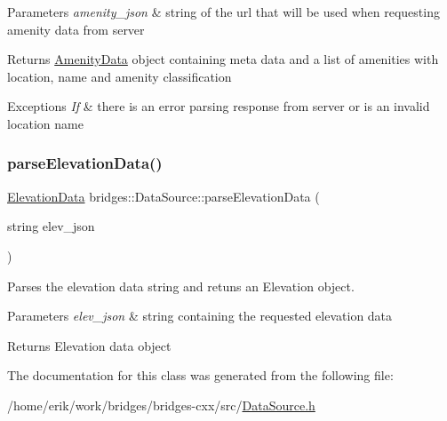 \begin{DoxyParams}{Parameters}
{\em amenity\+\_\+json} & string of the url that will be used when requesting amenity data from server\\
\hline
\end{DoxyParams}
\begin{DoxyReturn}{Returns}
\hyperlink{class_amenity_data}{Amenity\+Data} object containing meta data and a list of amenities with location, name and amenity classification
\end{DoxyReturn}

\begin{DoxyExceptions}{Exceptions}
{\em If} & there is an error parsing response from server or is an invalid location name \\
\hline
\end{DoxyExceptions}
\mbox{\label{classbridges_1_1_data_source_a84f1c70c6dd5be2f3df97015025c0dd3}} 
\subsubsection{\texorpdfstring{parse\+Elevation\+Data()}{parseElevationData()}}
{\footnotesize\ttfamily \hyperlink{classbridges_1_1dataset_1_1_elevation_data}{Elevation\+Data} bridges\+::\+Data\+Source\+::parse\+Elevation\+Data (\begin{DoxyParamCaption}\item[{string}]{elev\+\_\+json }\end{DoxyParamCaption})\hspace{0.3cm}{\ttfamily [inline]}}



Parses the elevation data string and retuns an Elevation object. 


\begin{DoxyParams}{Parameters}
{\em elev\+\_\+json} & string containing the requested elevation data\\
\hline
\end{DoxyParams}
\begin{DoxyReturn}{Returns}
Elevation data object 
\end{DoxyReturn}


The documentation for this class was generated from the following file\+:\begin{DoxyCompactItemize}
\item 
/home/erik/work/bridges/bridges-\/cxx/src/\hyperlink{_data_source_8h}{Data\+Source.\+h}\end{DoxyCompactItemize}
